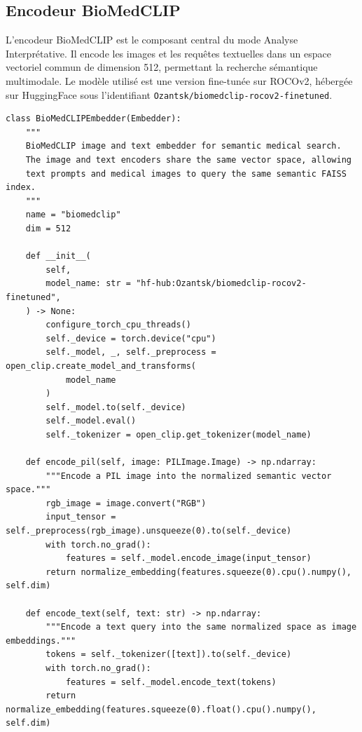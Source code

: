 \documentclass[12pt,a4paper]{article}
\begin{document}

\subsection{Encodeur BioMedCLIP}

\noindent L'encodeur BioMedCLIP est le composant central du mode Analyse
Interprétative. Il encode les images et les requêtes textuelles dans un
espace vectoriel commun de dimension 512, permettant la recherche sémantique
multimodale. Le modèle utilisé est une version fine-tunée sur ROCOv2,
hébergée sur HuggingFace sous l'identifiant
\texttt{Ozantsk/biomedclip-rocov2-finetuned}.

\begin{lstlisting}[style=mediscan, caption={Implémentation de l'encodeur BioMedCLIP (src/mediscan/embedders/biomedclip.py)}]
class BioMedCLIPEmbedder(Embedder):
    """
    BioMedCLIP image and text embedder for semantic medical search.
    The image and text encoders share the same vector space, allowing
    text prompts and medical images to query the same semantic FAISS index.
    """
    name = "biomedclip"
    dim = 512

    def __init__(
        self,
        model_name: str = "hf-hub:Ozantsk/biomedclip-rocov2-finetuned",
    ) -> None:
        configure_torch_cpu_threads()
        self._device = torch.device("cpu")
        self._model, _, self._preprocess = open_clip.create_model_and_transforms(
            model_name
        )
        self._model.to(self._device)
        self._model.eval()
        self._tokenizer = open_clip.get_tokenizer(model_name)

    def encode_pil(self, image: PILImage.Image) -> np.ndarray:
        """Encode a PIL image into the normalized semantic vector space."""
        rgb_image = image.convert("RGB")
        input_tensor = self._preprocess(rgb_image).unsqueeze(0).to(self._device)
        with torch.no_grad():
            features = self._model.encode_image(input_tensor)
        return normalize_embedding(features.squeeze(0).cpu().numpy(), self.dim)

    def encode_text(self, text: str) -> np.ndarray:
        """Encode a text query into the same normalized space as image embeddings."""
        tokens = self._tokenizer([text]).to(self._device)
        with torch.no_grad():
            features = self._model.encode_text(tokens)
        return normalize_embedding(features.squeeze(0).float().cpu().numpy(), self.dim)
\end{lstlisting}
\end{document}
